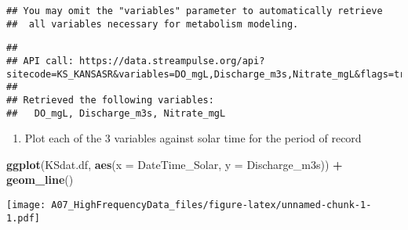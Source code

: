 \documentclass[]{article}
\newenvironment{Shaded}{\begin{snugshade}}{\end{snugshade}}
\newcommand{\DataTypeTok}[1]{\textcolor[rgb]{0.13,0.29,0.53}{#1}}
\newcommand{\DecValTok}[1]{\textcolor[rgb]{0.00,0.00,0.81}{#1}}
\newcommand{\KeywordTok}[1]{\textcolor[rgb]{0.13,0.29,0.53}{\textbf{#1}}}
\newcommand{\NormalTok}[1]{#1}
\newcommand{\OperatorTok}[1]{\textcolor[rgb]{0.81,0.36,0.00}{\textbf{#1}}}
\newcommand{\StringTok}[1]{\textcolor[rgb]{0.31,0.60,0.02}{#1}}
\providecommand{\tightlist}{%
  \setlength{\itemsep}{0pt}\setlength{\parskip}{0pt}}
\begin{document}
\begin{verbatim}
## You may omit the "variables" parameter to automatically retrieve
##  all variables necessary for metabolism modeling.
\end{verbatim}

\begin{verbatim}
## 
## API call: https://data.streampulse.org/api?sitecode=KS_KANSASR&variables=DO_mgL,Discharge_m3s,Nitrate_mgL&flags=true
## 
## Retrieved the following variables:
##   DO_mgL, Discharge_m3s, Nitrate_mgL
\end{verbatim}

\begin{Shaded}
\end{Shaded}

\begin{enumerate}
\def\labelenumi{\arabic{enumi}.}
\setcounter{enumi}{5}
\tightlist
\item
  Plot each of the 3 variables against solar time for the period of
  record
\end{enumerate}

\begin{Shaded}
\begin{Highlighting}[]
\KeywordTok{ggplot}\NormalTok{(KSdat.df, }\KeywordTok{aes}\NormalTok{(}\DataTypeTok{x =}\NormalTok{ DateTime_Solar, }\DataTypeTok{y =}\NormalTok{ Discharge_m3s)) }\OperatorTok{+}\StringTok{ }\KeywordTok{geom_line}\NormalTok{()}
\end{Highlighting}
\end{Shaded}

\texttt{[image: A07\_HighFrequencyData\_files/figure-latex/unnamed-chunk-1-1.pdf]}
\end{document}
